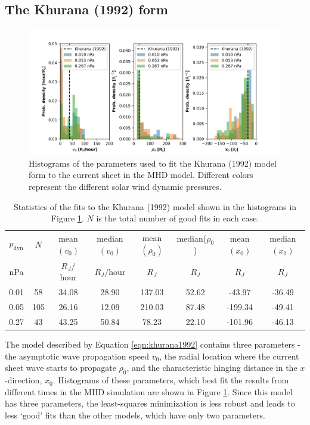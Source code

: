 \subsection{The Khurana (1992) form}
  
\begin{figure}
    \centering
    \includegraphics[width=\textwidth]{images5/comparison_highdynP_khurana.png}
    \caption{Histograms of the parameters used to fit the Khurana (1992) model form to the current sheet in the MHD model. Different colors represent the different solar wind dynamic pressures.}
    \label{fig:comparison-hist-khurana}
\end{figure}

\begin{table}
    \centering
    \begin{tabular}{c|c|c|c|c|c|c|c}
     $p_\text{dyn}$ &      $N$&  mean$(v_0)$&  median$(v_0)$&  mean$(\rho_0)$&    median($\rho_0$)& mean$(x_0)$&  median$(x_0)$\\
     nPa&   &   $R_J/$hour& $R_J/$hour& $R_J$   & $R_J$  &$R_J$  & $R_J$\\
     \hline
     0.01 &  58 &    34.08 &      28.90 &     137.03 &        52.62 &   -43.97 &     -36.49 \\
     0.05 & 105 &    26.16 &      12.09 &     210.03 &        87.48 &  -199.34 &     -49.41 \\
     0.27 &  43 &    43.25 &      50.84 &      78.23 &        22.10 &  -101.96 &     -46.13 \\
    \end{tabular}
    \caption{Statistics of the fits to the Khurana (1992) model shown in the histograms in Figure \protect\ref{fig:comparison-hist-khurana}. $N$ is the total number of good fits in each case.}
    \label{tab:comparison-khurana}
\end{table}

The model described by Equation \ref{eqn:khurana1992} contains three parameters - the asymptotic wave propagation speed $v_0$, the radial location where the current sheet wave starts to propagate $\rho_0$, and the characteristic hinging distance in the $x$-direction, $x_0$. Histograms of these parameters, which best fit the results from different times in the MHD simulation are shown in Figure \ref{fig:comparison-hist-khurana}. Since this model has three parameters, the least-squares minimization is less robust and leads to less `good' fits than the other models, which have only two parameters.

